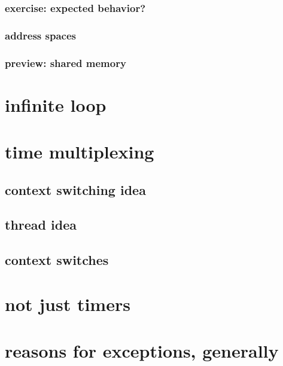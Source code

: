 \subsubsection{exercise: expected behavior?}


\subsubsection{address spaces}


\subsubsection{preview: shared memory}


\section{infinite loop}



\section{time multiplexing}


\subsection{context switching idea}


\subsection{thread idea}


\subsection{context switches} 


\section{not just timers}


\section{reasons for exceptions, generally}



